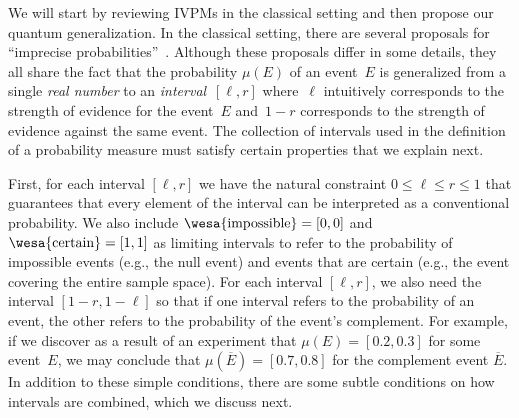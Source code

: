 \documentclass[english,reprint, aps, prl,superscriptaddress, showpacs,
showkeys, longbibliography, amsmath, amssymb]{revtex4-1}
\theoremstyle{plain}
\theoremstyle{definition}
\newcommand{\imposs}{{\text{\wesa{impossible}}}}
\newcommand{\necess}{{\text{\wesa{certain}}}}
\begin{document}
We will start by reviewing IVPMs in the classical setting and then
propose our quantum generalization. In the classical setting, there
are several proposals for ``imprecise
probabilities''~\citep{Dempster1967,Shafer1976,GilboaSchmeidler1994,Marinacci1999,Weichselberger2000,JamisonLodwick2004,HuberRonchetti2009,Grabisch2016}.
Although these proposals differ in some details, they all share the
fact that the probability $\mu(E)$ of an event~$E$ is generalized from
a single \emph{real number} to an \emph{interval}~$[\ell,r]$
where~$\ell$ intuitively corresponds to the strength of evidence for
the event~$E$ and~$1-r$ corresponds to the strength of evidence
against the same event. The collection of intervals used in the
definition of a probability measure must satisfy certain properties
that we explain next.

First, for each interval $[\ell,r]$ we have the natural constraint
$0 \leq \ell \leq r \leq 1$ that guarantees that every element of the
interval can be interpreted as a conventional probability. We also
include $\imposs=[0,0]$ and $\necess=[1,1]$ as limiting intervals to
refer to the probability of impossible events (e.g., the null event)
and events that are certain (e.g., the event covering the entire
sample space).  For each interval $[\ell,r]$, we also need the
interval $[1-r,1-\ell]$ so that if one interval refers to the
probability of an event, the other refers to the probability of the
event's complement.  For example, if we discover as a result of an
experiment that $\mu(E) = [0.2,0.3]$ for some event~$E$, we may
conclude that $\mu(\overline{E}) = [0.7,0.8]$ for the complement event
$\overline{E}$. In addition to these simple conditions, there are some
subtle conditions on how intervals are combined, which we discuss
next.
\end{document}
